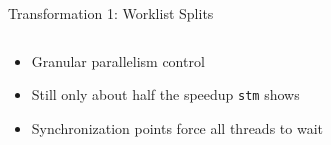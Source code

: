 \documentclass[aspectratio=169, usenames, dvipsnames]{beamer}
\begin{document}
\begin{frame}{Transformation 1: Worklist Splits}
  \begin{columns}
    \begin{column}{0.45\textwidth}
      \begin{itemize}
        \item<3-> Granular parallelism control
        \item<4-> Still only about half the speedup \alert{\texttt{stm}} shows
      \end{itemize}

      \vspace{1.5em}
      \begin{itemize}
        \item<5-> Synchronization points force all threads to wait
      \end{itemize}
    \end{column}
    \begin{column}{0.55\textwidth}
      \centering%
    \end{column}
  \end{columns}
\end{frame}
\end{document}
